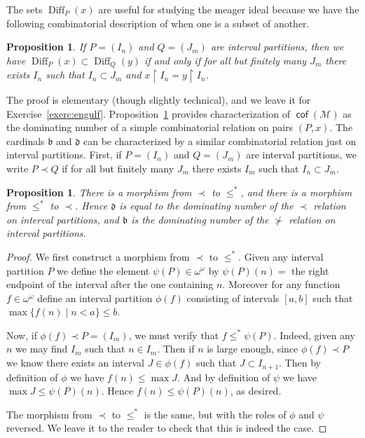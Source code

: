 \documentclass[11pt,oneside]{amsbook}
\newcommand{\Meager}{\mathcal M}
\DeclareMathOperator{\cof}{\mathsf{cof}}
\DeclareMathOperator{\Diff}{Diff}
\theoremstyle{definition}
\theoremstyle{plain}
\newtheorem{proposition}[theorem]{Proposition}
\theoremstyle{definition}
\theoremstyle{remark}
\numberwithin{equation}{section}
\numberwithin{figure}{section}
\begin{document}
The sets $\Diff_P(x)$ are useful for studying the meager ideal because we have the following combinatorial description of when one is a subset of another.

\begin{proposition}
  \label{prop:engulf}
  If $P=(I_n)$ and $Q=(J_m)$ are interval partitions, then we have $\Diff_P(x)\subset\Diff_Q(y)$ if and only if for all but finitely many $J_m$ there exists $I_n$ such that $I_n\subset J_m$ and $x\restriction I_n=y\restriction I_n$.
\end{proposition}

The proof is elementary (though slightly technical), and we leave it for Exercise~\ref{exerc:engulf}. Proposition~\ref{prop:engulf} provides characterization of $\cof(\Meager)$ as the dominating number of a simple combinatorial relation on pairs $(P,x)$. The cardinals $\mathfrak b$ and $\mathfrak d$ can be characterized by a similar combinatorial relation just on interval partitions. First, if $P=(I_n)$ and $Q=(J_m)$ are interval partitions, we write $P\prec Q$ if for all but finitely many $J_m$ there exists $I_m$ such that $I_n\subset J_m$.

\begin{proposition}
  There is a morphism from $\prec$ to $\leq^*$, and there is a morphism from $\leq^*$ to $\prec$. Hence $\mathfrak d$ is equal to the dominating number of the $\prec$ relation on interval partitions, and $\mathfrak b$ is the dominating number of the $\not\succ$ relation on interval partitions.
\end{proposition}

\begin{proof}
  We first construct a morphism from $\prec$ to $\leq^*$. Given any interval partition $P$ we define the element $\psi(P)\in\omega^\omega$ by $\psi(P)(n)=$ the right endpoint of the interval after the one containing $n$. Moreover for any function $f\in\omega^\omega$ define an interval partition $\phi(f)$ consisting of intervals $[a,b]$ such that $\max\{f(n)\mid n<a\}\leq b$.

  Now, if $\phi(f)\prec P=(I_m)$, we must verify that $f\leq^*\psi(P)$. Indeed, given any $n$ we may find $I_m$ such that $n\in I_m$. Then if $n$ is large enough, since $\phi(f)\prec P$ we know there exists an interval $J\in\phi(f)$ such that $J\subset I_{n+1}$. Then by definition of $\phi$ we have $f(n)\leq\max J$. And by definition of $\psi$ we have $\max J\leq\psi(P)(n)$. Hence $f(n)\leq\psi(P)(n)$, as desired.

  The morphism from $\prec$ to $\leq^*$ is the same, but with the roles of $\phi$ and $\psi$ reversed. We leave it to the reader to check that this is indeed the case.
\end{proof}
\end{document}
